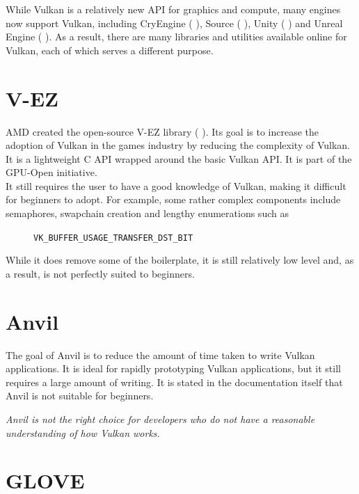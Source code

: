 \documentclass[12pt]{report}
\newcommand{\citebu}[1]{(\citenoparen{#1})}
\newcommand{\citenoparen}[1]{\citeauthor{#1} \citeyear{#1}}
\newcommand{\citesoftware}[1]{(\citeauthor{#1} \citeyear{#1})}
\newcommand{\quotebu}[2]
{
  \begin{displayquote}[\citenoparen{#2}]
    \textit{#1}
  \end{displayquote}
}
\theoremstyle{definition}
\begin{document}
    While Vulkan is a relatively new API for graphics and compute, many engines
    now support Vulkan, including CryEngine \citebu{cryengine}, Source \citebu{source}, Unity \citebu{unity} and Unreal
    Engine \citebu{ue4}. As a result, there are many libraries and utilities available
    online for Vulkan, each of which serves a different purpose.

    \section{V-EZ}

      AMD created the open-source V-EZ library \citesoftware{vez}. Its goal is to increase the
      adoption of Vulkan in the games industry by reducing the complexity of
      Vulkan. It is a lightweight C API wrapped around the basic Vulkan API.
      It is part of the GPU-Open initiative. \\
      
      It still requires the user to have a good knowledge of Vulkan, making it
      difficult for beginners to adopt. For example, some rather complex
      components include semaphores, swapchain creation and lengthy
      enumerations such as

        \begin{figure}[h!]
        \centering
        \verb|VK_BUFFER_USAGE_TRANSFER_DST_BIT|
        \end{figure}

      While it does remove some of the boilerplate, it is still relatively low
      level and, as a result, is not perfectly suited to beginners.

    \section{Anvil}

      The goal of Anvil is to reduce the amount of time taken to write Vulkan
      applications. It is ideal for rapidly prototyping Vulkan applications,
      but it still requires a large amount of writing. It is stated in the
      documentation itself that Anvil is not suitable for beginners.

      \quotebu{
        Anvil is not the right choice for developers who do not have a
        reasonable understanding of how Vulkan works.
      }{anvil}

    \section{GLOVE}
\end{document}
